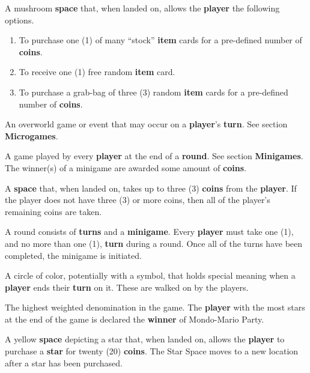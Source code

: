 \documentclass{article}
\begin{document}
\begin{description}[style=nextline]
\item[Item Store] A mushroom \textbf{space} that, when landed on,
allows the \textbf{player} the following options.

	\begin{enumerate}
	\item To purchase one (1) of many ``stock'' \textbf{item} cards
		for a pre-defined number of \textbf{coins}.
	\item To receive one (1) free random \textbf{item} card.
	\item To purchase a grab-bag of three (3) random \textbf{item} cards
		for a pre-defined number of \textbf{coins}.
	\end{enumerate}

\item[Microgame] An overworld game or event that may occur on a \textbf{player}'s
\textbf{turn}. See section \textbf{Microgames}.

\item[Minigame] A game played by every \textbf{player} at the end of a \textbf{round}.
See section \textbf{Minigames}.  The winner(s) of a minigame are awarded
some amount of \textbf{coins}.

\item[Red Space] A \textbf{space} that, when landed on, takes up to
three (3) \textbf{coins} from the \textbf{player}.  If the player does
not have three (3) or more coins, then all of the player's remaining
coins are taken.

\item[Round] A round consists of \textbf{turns} and a \textbf{minigame}.
Every \textbf{player} must take one (1), and no more than one (1),
\textbf{turn} during a round.  Once all of the turns have been completed,
the minigame is initiated.

\item[Space] A circle of color, potentially with a symbol, that holds
special meaning when a \textbf{player} ends their \textbf{turn} on it.
These are walked on by the players.

\item[Star] The highest weighted denomination in the game.  The \textbf{player}
with the most stars at the end of the game is declared the \textbf{winner}
of Mondo-Mario Party.

\item[Star Space] A yellow \textbf{space} depicting a star that, when landed
on, allows the \textbf{player} to purchase a \textbf{star} for twenty (20)
\textbf{coins}.  The Star Space moves to a new location after a star has been
purchased.


\end{description}
\end{document}
